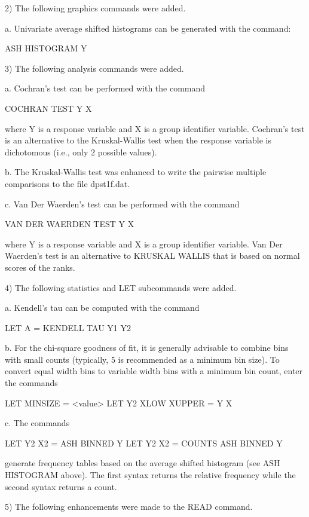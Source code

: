 { 2) The following graphics commands were added.

    a. Univariate average shifted histograms can be generated with
       the command:

           ASH HISTOGRAM Y

 3) The following analysis commands were added.

    a. Cochran's test can be performed with the command

           COCHRAN TEST Y X

       where Y is a response variable and X is a group identifier
       variable.  Cochran's test is an alternative to the
       Kruskal-Wallis test when the response variable is dichotomous
       (i.e., only 2 possible values).

    b. The Kruskal-Wallis test was enhanced to write the pairwise
       multiple comparisons to the file dpst1f.dat.

    c. Van Der Waerden's test can be performed with the command

          VAN DER WAERDEN TEST Y X

       where Y is a response variable and X is a group identifier
       variable.  Van Der Waerden's test is an alternative to
       KRUSKAL WALLIS that is based on normal scores of the ranks.

 4) The following statistics and LET subcommands were added.

    a. Kendell's tau can be computed with the command

          LET A = KENDELL TAU Y1 Y2

    b. For the chi-square goodness of fit, it is generally advisable
       to combine bins with small counts (typically, 5 is recommended
       as a minimum bin size).  To convert equal width bins to
       variable width bins with a minimum bin count, enter the
       commands

          LET MINSIZE = <value>
          LET Y2 XLOW XUPPER  = Y X

    c. The commands

         LET Y2 X2 = ASH BINNED Y
         LET Y2 X2 = COUNTS ASH BINNED Y

       generate frequency tables based on the average shifted
       histogram (see ASH HISTOGRAM above).  The first syntax returns
       the relative frequency while the second syntax returns a
       count.

 5) The following enhancements were made to the READ command.

}
